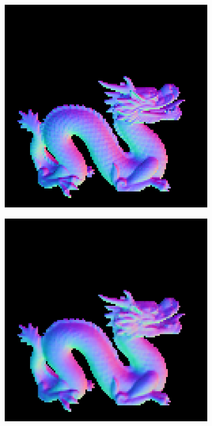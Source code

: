 \begin{figure}[H]
	\centering
	\begin{subfigure}[b]{0.24\linewidth}
		\includegraphics[width=\linewidth]{./Figures/gcnn_synthetic/fancy_eval_7_groundtruth.png}
	\end{subfigure}
	\begin{subfigure}[b]{0.24\linewidth}
		\includegraphics[width=\linewidth]{./Figures/gcnn_synthetic/fancy_eval_7_normal_GCNN-GCNN.png}

\end{subfigure}
\end{figure}
